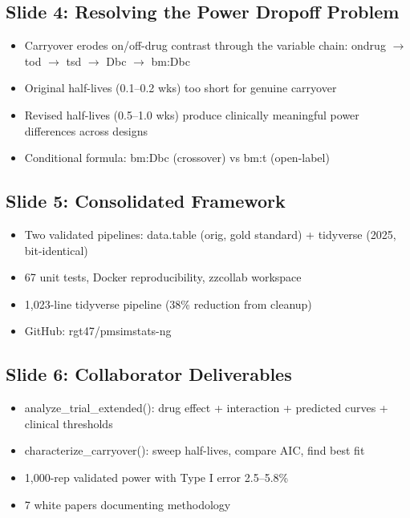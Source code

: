 \documentclass[11pt]{article}
\begin{document}
\subsection{Slide 4: Resolving the Power Dropoff Problem}

\begin{itemize}
  \item Carryover erodes on/off-drug contrast through the variable
    chain: ondrug $\to$ tod $\to$ tsd $\to$ Dbc $\to$ bm:Dbc
  \item Original half-lives (0.1--0.2 wks) too short for genuine
    carryover
  \item Revised half-lives (0.5--1.0 wks) produce clinically
    meaningful power differences across designs
  \item Conditional formula: bm:Dbc (crossover) vs bm:t (open-label)
\end{itemize}

\subsection{Slide 5: Consolidated Framework}

\begin{itemize}
  \item Two validated pipelines: data.table (orig, gold standard) +
    tidyverse (2025, bit-identical)
  \item 67 unit tests, Docker reproducibility, zzcollab workspace
  \item 1,023-line tidyverse pipeline (38\% reduction from cleanup)
  \item GitHub: rgt47/pmsimstats-ng
\end{itemize}

\subsection{Slide 6: Collaborator Deliverables}

\begin{itemize}
  \item analyze\_trial\_extended(): drug effect + interaction + predicted
    curves + clinical thresholds
  \item characterize\_carryover(): sweep half-lives, compare AIC, find
    best fit
  \item 1,000-rep validated power with Type I error 2.5--5.8\%
  \item 7 white papers documenting methodology
\end{itemize}
\end{document}
